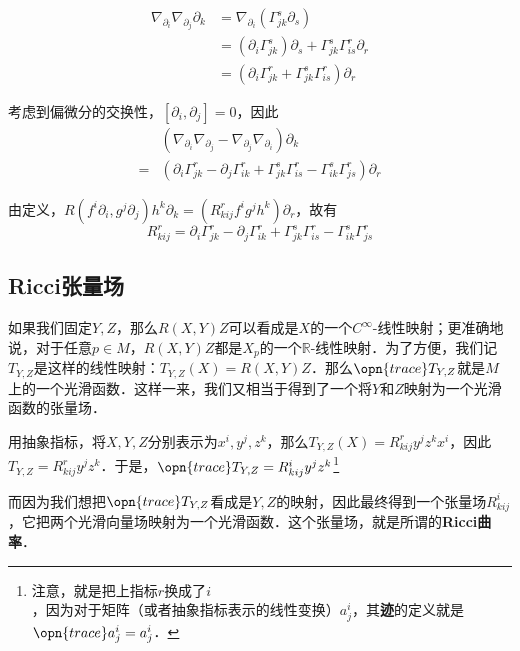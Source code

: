 \begin{equation}
\begin{aligned}
\nabla_{\partial_i}\nabla_{\partial_j}\partial_k&=\nabla_{\partial_i}(\Gamma^s_{jk}\partial_s)\\
&=(\partial_i\Gamma^s_{jk})\partial_s+\Gamma^s_{jk}\Gamma^r_{is}\partial_r\\
&=(\partial_i\Gamma^r_{jk}+\Gamma^s_{jk}\Gamma^r_{is})\partial_r
\end{aligned}
\end{equation}


考虑到偏微分的交换性，$[\partial_i, \partial_j]=0$，因此
\begin{equation}
\begin{aligned}
&(\nabla_{\partial_i}\nabla_{\partial_j}-\nabla_{\partial_j}\nabla_{\partial_i})\partial_k\\
=&(\partial_i\Gamma^r_{jk}-\partial_j\Gamma^{r}_{ik}+\Gamma^s_{jk}\Gamma^r_{is}-\Gamma^s_{ik}\Gamma^r_{js})\partial_r
\end{aligned}
\end{equation}

由定义，$R(f^i\partial_i, g^j\partial_j)h^k\partial_k=(R^r_{kij}f^ig^jh^k)\partial_r$，故有
\begin{equation}
R^r_{kij}=\partial_i\Gamma^r_{jk}-\partial_j\Gamma^{r}_{ik}+\Gamma^s_{jk}\Gamma^r_{is}-\Gamma^s_{ik}\Gamma^r_{js}
\end{equation}


\subsection{Ricci张量场}

如果我们固定$Y, Z$，那么$R(X, Y)Z$可以看成是$X$的一个$C^{\infty}$-线性映射；更准确地说，对于任意$p\in M$，$R(X, Y)Z$都是$X_p$的一个$\mathbb{R}$-线性映射．为了方便，我们记$T_{Y, Z}$是这样的线性映射：$T_{Y, Z}(X)=R(X, Y)Z$．那么$\opn{trace}T_{Y, Z}$就是$M$上的一个光滑函数．这样一来，我们又相当于得到了一个将$Y$和$Z$映射为一个光滑函数的张量场．

用抽象指标，将$X, Y, Z$分别表示为$x^i, y^j, z^k$，那么$T_{Y, Z}(X)=R^r_{kij}y^jz^kx^i$，因此$T_{Y, Z}=R^r_{kij}y^jz^k$．于是，$\opn{trace}T_{Y, Z}=R^i_{kij}y^jz^k$\footnote{注意，就是把上指标$r$换成了$i$，因为对于矩阵（或者抽象指标表示的线性变换）$a^i_j$，其\textbf{迹}的定义就是$\opn{trace}a^i_j=a^i_j$．}

而因为我们想把$\opn{trace}T_{Y, Z}$看成是$Y, Z$的映射，因此最终得到一个张量场$R^i_{kij}$，它把两个光滑向量场映射为一个光滑函数．这个张量场，就是所谓的\textbf{Ricci曲率}．

